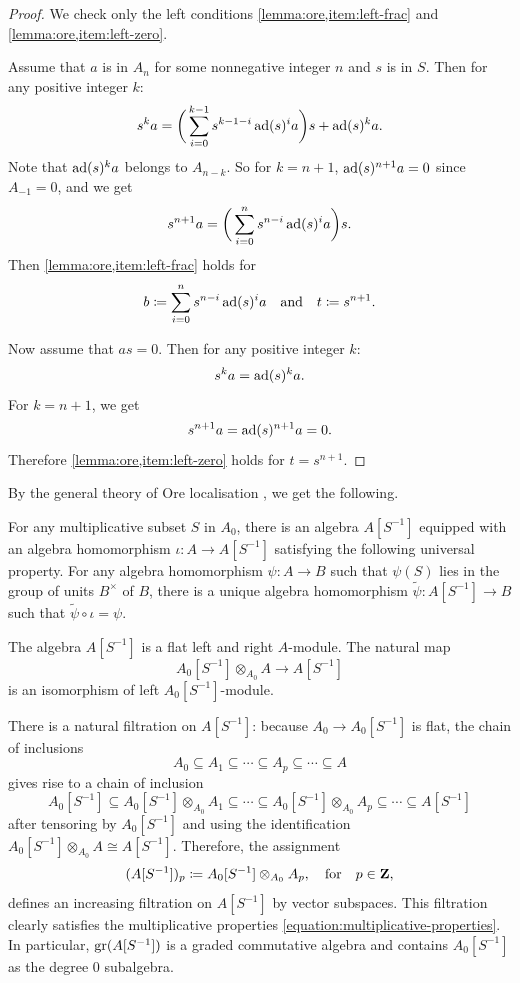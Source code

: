 \begin{proof}
	We check only the left conditions \eqref{lemma:ore,item:left-frac} and \eqref{lemma:ore,item:left-zero}.
	
	Assume that $a$ is in $A_n$ for some nonnegative integer $n$ and $s$ is in $S$. Then for any positive integer $k$:
	\[ s^{k} a = \bigg(\sum_{i=0}^{k - 1} s^{k - 1 - i} \operatorname{ad}(s)^i a\bigg) s + \operatorname{ad}(s)^{k} a. \] 
	Note that $\operatorname{ad}(s)^{k} a$ belongs to $A_{n - k}$. So for $k = n + 1$,
	$\operatorname{ad}(s)^{n + 1} a = 0$ since $A_{-1} = 0$, and we get
	\[ s^{n+1} a = \bigg(\sum_{i=0}^{n} s^{n - i} \operatorname{ad}(s)^i a\bigg) s. \]
	Then \eqref{lemma:ore,item:left-frac} holds for
	\[ b \coloneqq \sum_{i=0}^{n} s^{n - i} \operatorname{ad}(s)^i a \quad \text{and} \quad t \coloneqq s^{n + 1}. \]
	
	Now assume that $a s = 0$. Then for any positive integer $k$:
	\[ s^k a = \operatorname{ad}(s)^k a. \]
	For $k = n + 1$, we get
	\[ s^{n + 1} a = \operatorname{ad}(s)^{n + 1} a = 0. \]
	Therefore \eqref{lemma:ore,item:left-zero} holds for $t = s^{n + 1}$.
\end{proof}

By the general theory of Ore localisation \cite[Chapter II]{stenstrom1975rings}, we get the following.

\begin{proposition} \label{proposition:fraction}
	For any multiplicative subset $S$ in $A_0$, there is an algebra $A[S^{-1}]$ equipped with an algebra homomorphism $\iota \colon A \rightarrow A[S^{-1}]$ satisfying the following universal property. For any algebra homomorphism $\psi \colon A \rightarrow B$ such that $\psi(S)$ lies in the group of units $B^\times$ of $B$, there is a unique algebra homomorphism $\widetilde{\psi} \colon A[S^{-1}] \rightarrow B$ such that $\widetilde{\psi} \circ \iota = \psi$.
	
	The algebra $A[S^{-1}]$ is a flat left and right $A$-module. The natural map
	\[ A_0[S^{-1}] \otimes_{A_0} A \longrightarrow A[S^{-1}] \]
	is an isomorphism of left $A_0[S^{-1}]$-module.
\end{proposition}

There is a natural filtration on $A[S^{-1}]$: because $A_0 \rightarrow A_0[S^{-1}]$ is flat, the chain of inclusions
\[ A_0 \subseteq A_1 \subseteq \cdots \subseteq A_p \subseteq \cdots \subseteq A \]
gives rise to a chain of inclusion
\[ A_0[S^{-1}] \subseteq A_0[S^{-1}] \otimes_{A_0} A_1  \subseteq \cdots \subseteq A_0[S^{-1}] \otimes_{A_0} A_p \subseteq \cdots \subseteq A[S^{-1}] \]
after tensoring by $A_0[S^{-1}]$ and using the identification $A_0[S^{-1}] \otimes_{A_0} A \cong A[S^{-1}]$. Therefore, the assignment
\[ (A[S^{-1}])_p \coloneqq A_0[S^{-1}] \otimes_{A_0} A_p, \quad \text{for} \quad p \in \mathbf{Z},  \]
defines an increasing filtration on $A[S^{-1}]$ by vector subspaces. This filtration clearly satisfies the multiplicative properties \eqref{equation:multiplicative-properties}. In particular, $\operatorname{gr}(A[S^{-1}])$ is a graded commutative algebra and contains $A_0[S^{-1}]$ as the degree 0 subalgebra.


